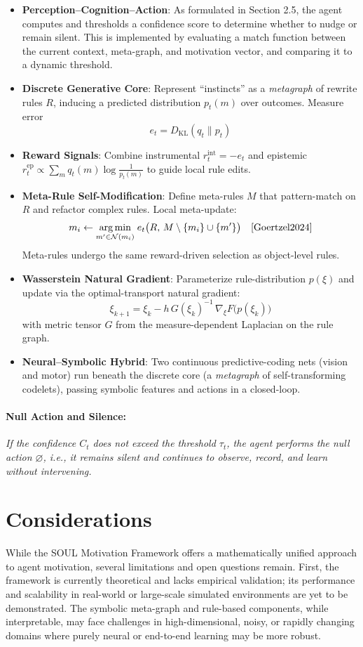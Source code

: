 \documentclass[11pt]{article}
\begin{document}
\begin{itemize}
  \item \textbf{Perception--Cognition--Action}: As formulated in Section 2.5, the agent computes and thresholds a confidence score to determine whether to nudge or remain silent. This is implemented by evaluating a match function between the current context, meta-graph, and motivation vector, and comparing it to a dynamic threshold.
  \item \textbf{Discrete Generative Core}: Represent “instincts” as a \emph{metagraph} of rewrite rules $R$, inducing a predicted distribution $p_t(m)$ over outcomes. Measure error \cite{Goertzel2024}
  \[
    e_t = D_{\mathrm{KL}}(q_t\|p_t)
  \]
  \item \textbf{Reward Signals}: Combine instrumental $r^{\mathrm{int}}_t=-e_t$ and epistemic $r^{\mathrm{ep}}_t\propto\sum_m q_t(m)\log\tfrac1{p_t(m)}$ to guide local rule edits.\cite{Goertzel2024}
  \item \textbf{Meta-Rule Self-Modification}: Define meta-rules $M$ that pattern-match on $R$ and refactor complex rules. Local meta-update:
  \[
    m_i \leftarrow \underset{m'\in\mathcal{N}(m_i)}{\arg\min}\;e_t\bigl(R,\,M\setminus\{m_i\}\cup\{m'\}\bigr)\quad\cite{Goertzel2024}
  \]
  Meta-rules undergo the same reward-driven selection as object-level rules.
  \item \textbf{Wasserstein Natural Gradient}: Parameterize rule-distribution $p(\xi)$ and update via the optimal-transport natural gradient:\cite{Goertzel2024}
  \[
    \xi_{k+1} = \xi_k - h\,G(\xi_k)^{-1}\,\nabla_{\xi}F\bigl(p(\xi_k)\bigr)
  \]
  with metric tensor $G$ from the measure-dependent Laplacian on the rule graph.
  \item \textbf{Neural–Symbolic Hybrid}: Two continuous predictive-coding nets (vision and motor) run beneath the discrete core (a \emph{metagraph} of self-transforming codelets), passing symbolic features and actions in a closed-loop.\cite{Goertzel2024}
\end{itemize}

\paragraph{Null Action and Silence:}
\textit{If the confidence $C_t$ does not exceed the threshold $\tau_t$, the agent performs the null action $\varnothing$, i.e., it remains silent and continues to observe, record, and learn without intervening.}

\section{Considerations}
While the SOUL Motivation Framework offers a mathematically unified approach to agent motivation, several limitations and open questions remain. First, the framework is currently theoretical and lacks empirical validation; its performance and scalability in real-world or large-scale simulated environments are yet to be demonstrated. The symbolic meta-graph and rule-based components, while interpretable, may face challenges in high-dimensional, noisy, or rapidly changing domains where purely neural or end-to-end learning may be more robust.
\end{document}
